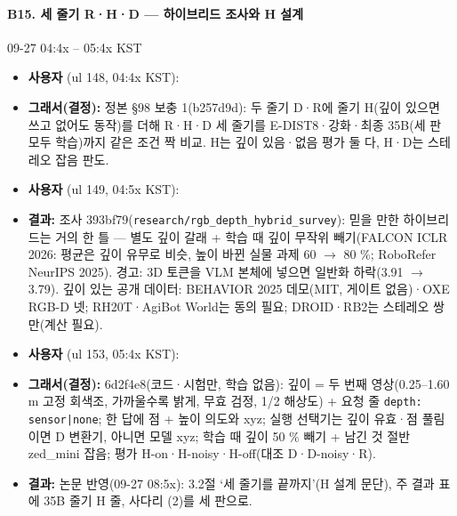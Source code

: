 \paragraph{B15. 세 줄기 R·H·D --- 하이브리드 조사와 H 설계}
{\small 09-27 04:4x -- 05:4x KST}
\begin{itemize}
  \item \textbf{사용자} (ul 148, 04:4x KST): 
  \item \textbf{그래서(결정):} 정본 §98 보충 1(b257d9d): 두 줄기 D·R에 줄기 H(깊이 있으면 쓰고 없어도 동작)를 더해 R·H·D 세 줄기를 E-DIST8·강화·최종 35B(세 판 모두 학습)까지 같은 조건 짝 비교. H는 깊이 있음·없음 평가 둘 다, H·D는 스테레오 잡음 판도.
  \item \textbf{사용자} (ul 149, 04:5x KST): 
  \item \textbf{결과:} 조사 393bf79(\texttt{research/\allowbreak{}rgb\_\allowbreak{}depth\_\allowbreak{}hybrid\_\allowbreak{}survey}): 믿을 만한 하이브리드는 거의 한 틀 --- 별도 깊이 갈래 + 학습 때 깊이 무작위 빼기(FALCON ICLR 2026: 평균은 깊이 유무로 비슷, 높이 바뀐 실물 과제 60 $\rightarrow$ 80 \%; RoboRefer NeurIPS 2025). 경고: 3D 토큰을 VLM 본체에 넣으면 일반화 하락(3.91 $\rightarrow$ 3.79). 깊이 있는 공개 데이터: BEHAVIOR 2025 데모(MIT, 게이트 없음)·OXE RGB-D 넷; RH20T·AgiBot World는 동의 필요; DROID·RB2는 스테레오 쌍만(계산 필요).
  \item \textbf{사용자} (ul 153, 05:4x KST): 
  \item \textbf{그래서(결정):} 6d2f4e8(코드·시험만, 학습 없음): 깊이 = 두 번째 영상(0.25--1.60 m 고정 회색조, 가까울수록 밝게, 무효 검정, 1/2 해상도) + 요청 줄 \texttt{depth: sensor|none}; 한 답에 점 + 높이 의도와 xyz; 실행 선택기는 깊이 유효·점 풀림이면 D 변환기, 아니면 모델 xyz; 학습 때 깊이 50 \% 빼기 + 남긴 것 절반 zed\_mini 잡음; 평가 H-on·H-noisy·H-off(대조 D·D-noisy·R).
  \item \textbf{결과:} 논문 반영(09-27 08:5x): 3.2절 `세 줄기를 끝까지'(H 설계 문단), 주 결과 표에 35B 줄기 H 줄, 사다리 (2)를 세 판으로.
\end{itemize}

